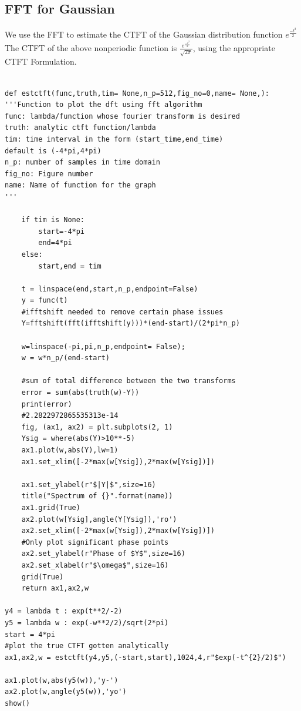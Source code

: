 \documentclass[11pt, a4paper]{article}
\begin{document}
\subsection{FFT for Gaussian}
{
We use the FFT to estimate the CTFT of the Gaussian distribution function
$e^{\frac{-t^2}{2}}$
\\
The CTFT of the above nonperiodic function is
$\frac{e^{\frac{-t^2}{2}}}{\sqrt{2\pi}}$,
using the appropriate CTFT Formulation.
}
\begin{verbatim}

def estctft(func,truth,tim= None,n_p=512,fig_no=0,name= None,):
'''Function to plot the dft using fft algorithm
func: lambda/function whose fourier transform is desired
truth: analytic ctft function/lambda
tim: time interval in the form (start_time,end_time)
default is (-4*pi,4*pi)
n_p: number of samples in time domain
fig_no: Figure number
name: Name of function for the graph
'''
    
    if tim is None:
        start=-4*pi
        end=4*pi
    else:
        start,end = tim

    t = linspace(end,start,n_p,endpoint=False)
    y = func(t)
    #ifftshift needed to remove certain phase issues
    Y=fftshift(fft(ifftshift(y)))*(end-start)/(2*pi*n_p)

    w=linspace(-pi,pi,n_p,endpoint= False);
    w = w*n_p/(end-start)
    
    #sum of total difference between the two transforms
    error = sum(abs(truth(w)-Y))
    print(error)
    #2.2822972865535313e-14
    fig, (ax1, ax2) = plt.subplots(2, 1)
    Ysig = where(abs(Y)>10**-5)
    ax1.plot(w,abs(Y),lw=1)
    ax1.set_xlim([-2*max(w[Ysig]),2*max(w[Ysig])])

    ax1.set_ylabel(r"$|Y|$",size=16)
    title("Spectrum of {}".format(name))
    ax1.grid(True)
    ax2.plot(w[Ysig],angle(Y[Ysig]),'ro')
    ax2.set_xlim([-2*max(w[Ysig]),2*max(w[Ysig])])
    #Only plot significant phase points
    ax2.set_ylabel(r"Phase of $Y$",size=16)
    ax2.set_xlabel(r"$\omega$",size=16)
    grid(True)
    return ax1,ax2,w

y4 = lambda t : exp(t**2/-2)
y5 = lambda w : exp(-w**2/2)/sqrt(2*pi)
start = 4*pi
#plot the true CTFT gotten analytically
ax1,ax2,w = estctft(y4,y5,(-start,start),1024,4,r"$exp(-t^{2}/2)$")

ax1.plot(w,abs(y5(w)),'y-')
ax2.plot(w,angle(y5(w)),'yo')
show()

\end{verbatim}
\end{document}
